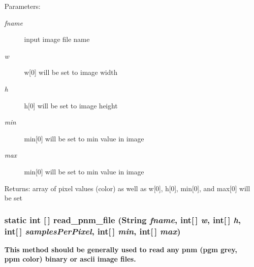 \begin{Desc}
\item[Parameters:]
\begin{description}
\item[{\em fname}]input image file name \item[{\em w}]w[0] will be set to image width \item[{\em h}]h[0] will be set to image height \item[{\em min}]min[0] will be set to min value in image \item[{\em max}]min[0] will be set to min value in image\end{description}
\end{Desc}
\begin{Desc}
\item[Returns:]array of pixel values (color) as well as w[0], h[0], min[0], and max[0] will be set \end{Desc}
\subsubsection{\setlength{\rightskip}{0pt plus 5cm}static int [$\,$] read\_\-pnm\_\-file (String {\em fname}, int[$\,$] {\em w}, int[$\,$] {\em h}, int[$\,$] {\em samples\-Per\-Pixel}, int[$\,$] {\em min}, int[$\,$] {\em max})\hspace{0.3cm}{\tt  [static]}}\label{class_c_s_image_viewer_1_1pnm_helper_06e33b709cf385d3b8e5d33a1064acb0}


{\bf  This method should be generally used to read any pnm (pgm grey, ppm color) binary or ascii image files. } 

